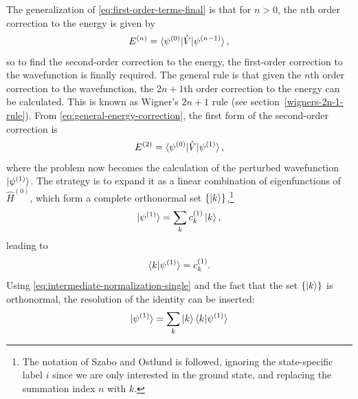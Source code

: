 \documentclass[%
class = book,%
crop = false,%
float = true,%
multi = true,%
preview = false,%
]{standalone}
\let\cite\autocite
\begin{document}
The generalization of \eqref{eq:first-order-terms-final} is that for \(n > 0\), the \(n\)th order correction to the energy is given by
\begin{equation}
  \label{eq:general-energy-correction}
  E^{(n)} = \braket{\psi^{(0)}|\hat{V}|\psi^{(n-1)}},
\end{equation}
so to find the second-order correction to the energy, the first-order correction to the wavefunction is finally required. The general rule is that given the \(n\)th order correction to the wavefunction, the \(2n+1\)th order correction to the energy can be calculated. This is known as Wigner's \(2n+1\) rule (see section~\ref{wigners-2n-1-rule}). From \eqref{eq:general-energy-correction}, the first form of the second-order correction is
\begin{equation}
  \label{eq:second-order-correction-first-form}
  E^{(2)} = \braket{\psi^{(0)}|\hat{V}|\psi^{(1)}},
\end{equation}
where the problem now becomes the calculation of the perturbed wavefunction \(\ket{\psi^{(1)}}\). The strategy is to expand it as a linear combination of eigenfunctions of \(\hat{H}^{(0)}\), which form a complete orthonormal set \(\{\ket{k}\}\),\footnote{The notation of Szabo and Ostlund\cite{szabo1989modern} is followed, ignoring the state-specific label \(i\) since we are only interested in the ground state, and replacing the summation index \(n\) with \(k\).}
\begin{equation}
  \label{eq:orthonormal-eigenfunction-expansion}
  \ket{\psi^{(1)}} = \sum_{k} c_{k}^{(1)} \ket{k},
\end{equation}
leading to
\begin{equation}
  \label{eq:coefficient-selection}
  \braket{k|\psi^{(1)}} = c_{k}^{(1)}.
\end{equation}
Using \eqref{eq:intermediate-normalization-single} and the fact that the set \(\{\ket{k}\}\) is orthonormal, the resolution of the identity can be inserted:
\begin{equation}
  \label{eq:resolution-of-the-identity}
  \ket{\psi^{(1)}} = \sum_{k} \ket{k} \braket{k|\psi^{(1)}}
\end{equation}
\end{document}
